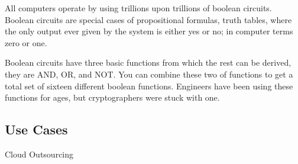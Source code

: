All computers operate by using trillions upon trillions of boolean circuits. Boolean circuits are special cases of propositional formulas, truth tables, where the only output ever given by the system is either yes or no; in computer terms zero or one. 

Boolean circuits have three basic functions from which the rest can be derived, they are AND, OR, and NOT. You can combine these two of functions to get a total set of sixteen different boolean functions. Engineers have been using these functions for ages, but cryptographers were stuck with one. 

\subsection{Use Cases}
Cloud Outsourcing 

